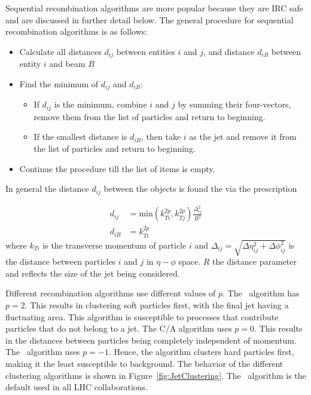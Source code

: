Sequential recombination algorithms are more popular because they are IRC safe and are discussed in further detail below. 
The general procedure for sequential recombination algorithms is as follows:
\begin{itemize}
\item Calculate all distances $d_{ij}$ between entities $i$ and $j$, and distance $d_{iB}$ between entity $i$ and beam $B$
\item Find the minimum of $d_{ij}$ and $d_{iB}$:
\begin{itemize}
\item If $d_{ij}$ is the minimum, combine $i$ and $j$ by summing their four-vectors, remove them from the list of particles and return to beginning.
\item If the smallest distance is $d_{iB}$, then take $i$ as the jet and remove it from the list of particles and return to beginning.
\end{itemize}
\item Continue the procedure till the list of items is empty.
\end{itemize}

In general the distance $d_{ij}$ between the objects is found the via the prescription

\begin{align}
d_{ij} &= \mathrm{min} (k_{Ti}^{2p} , k_{Tj}^{2p}) \frac{\Delta_{ij}^2}{R^2}  \\
d_{iB} &= k_{Ti}^{2p}
\end{align}
where $k_{Ti}$ is the transverse momentum of particle $i$ and $\Delta_{ij} = \sqrt{\Delta\eta_{ij}^2 + \Delta\phi_{ij}^2}$ is the distance between particles $i$ and $j$ in $\eta-\phi$ space.
$R$ the distance parameter and reflects the size of the jet being considered.

Different recombination algorithms use different values of $p$. 
The \kt\ algorithm has $p = 2$.
This results in clustering soft particles first, with the final jet having a fluctuating area.
This algorithm is susceptible to processes that contribute particles that do not belong to a jet.
The C/A algorithm uses $p = 0$.
This results in the distances between particles being completely independent of momentum. 
The \antikt\ algorithm uses $p = -1$.
Hence, the algorithm clusters hard particles first, making it the least susceptible to background. 
The behavior of the different clustering algorithms is shown in Figure~\ref{fig:JetClustering}.
The \antikt\ algorithm is the default used in all LHC collaborations.

